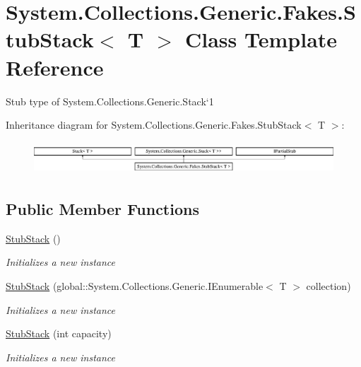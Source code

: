 \hypertarget{class_system_1_1_collections_1_1_generic_1_1_fakes_1_1_stub_stack_3_01_t_01_4}{\section{System.\-Collections.\-Generic.\-Fakes.\-Stub\-Stack$<$ T $>$ Class Template Reference}
\label{class_system_1_1_collections_1_1_generic_1_1_fakes_1_1_stub_stack_3_01_t_01_4}
}


Stub type of System.\-Collections.\-Generic.\-Stack`1 


Inheritance diagram for System.\-Collections.\-Generic.\-Fakes.\-Stub\-Stack$<$ T $>$\-:\begin{figure}[H]
\begin{center}
\leavevmode
\includegraphics[height=1.228070cm]{class_system_1_1_collections_1_1_generic_1_1_fakes_1_1_stub_stack_3_01_t_01_4}
\end{center}
\end{figure}
\subsection*{Public Member Functions}
\begin{DoxyCompactItemize}
\item 
\hyperlink{class_system_1_1_collections_1_1_generic_1_1_fakes_1_1_stub_stack_3_01_t_01_4_ac601f0f26861ffa7bd7dca9f94c355c7}{Stub\-Stack} ()
\begin{DoxyCompactList}\small\item\em Initializes a new instance\end{DoxyCompactList}\item 
\hyperlink{class_system_1_1_collections_1_1_generic_1_1_fakes_1_1_stub_stack_3_01_t_01_4_a7d2e17f4772c74b2a0468e530af1a258}{Stub\-Stack} (global\-::\-System.\-Collections.\-Generic.\-I\-Enumerable$<$ T $>$ collection)
\begin{DoxyCompactList}\small\item\em Initializes a new instance\end{DoxyCompactList}\item 
\hyperlink{class_system_1_1_collections_1_1_generic_1_1_fakes_1_1_stub_stack_3_01_t_01_4_a24d962400b7b20cc7bc6538ab4210153}{Stub\-Stack} (int capacity)
\begin{DoxyCompactList}\small\item\em Initializes a new instance\end{DoxyCompactList}\end{DoxyCompactItemize}
